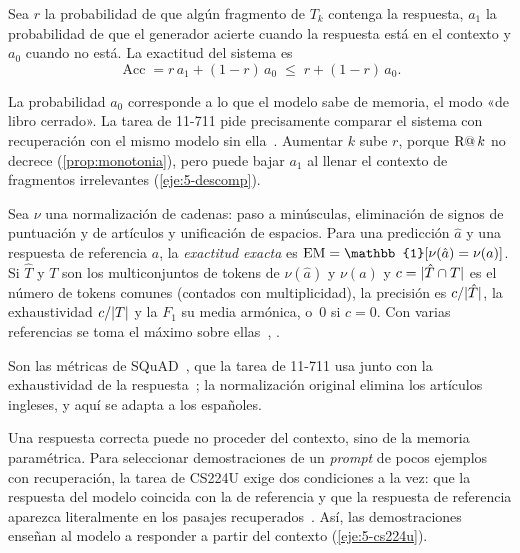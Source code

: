 \begin{proposicion}\label{prop:descomp}
Sea $r$ la probabilidad de que algún fragmento de $T_k$ contenga la respuesta, $a_1$ la probabilidad de que el generador acierte cuando la respuesta está en el contexto y $a_0$ cuando no está. La exactitud del sistema es
\[
\operatorname{Acc}=r\,a_1+(1-r)\,a_0\;\le\;r+(1-r)\,a_0 .
\]
\end{proposicion}

La probabilidad $a_0$ corresponde a lo que el modelo sabe de memoria, el modo «de libro cerrado». La tarea de 11-711 pide precisamente comparar el sistema con recuperación con el mismo modelo sin ella~\cite{cmu711}. Aumentar $k$ sube $r$, porque $\operatorname{R@}k$ no decrece (\cref{prop:monotonia}), pero puede bajar $a_1$ al llenar el contexto de fragmentos irrelevantes (\cref{eje:5-descomp}).

\begin{definicion}\label{def:em-f1}
Sea $\nu$ una normalización de cadenas: paso a minúsculas, eliminación de signos de puntuación y de artículos y unificación de espacios. Para una predicción $\hat a$ y una respuesta de referencia $a$, la \emph{exactitud exacta} es $\EM=\mathbb{1}[\nu(\hat a)=\nu(a)]$. Si $\hat T$ y $T$ son los multiconjuntos de tokens de $\nu(\hat a)$ y $\nu(a)$ y $c=\lvert\hat T\cap T\rvert$ es el número de tokens comunes (contados con multiplicidad), la precisión es $c/\lvert\hat T\rvert$, la exhaustividad $c/\lvert T\rvert$ y la $F_1$ su media armónica, o~0 si $c=0$. Con varias referencias se toma el máximo sobre ellas~\cite{squad}, \cite[§11.6]{jm3}.
\end{definicion}

Son las métricas de SQuAD~\cite{squad}, que la tarea de 11-711 usa junto con la exhaustividad de la respuesta~\cite{cmu711}; la normalización original elimina los artículos ingleses, y aquí se adapta a los españoles.

\addtocounter{definicion}{1}%

\begin{observacion}
Una respuesta correcta puede no proceder del contexto, sino de la memoria paramétrica. Para seleccionar demostraciones de un \emph{prompt} de pocos ejemplos con recuperación, la tarea de CS224U exige dos condiciones a la vez: que la respuesta del modelo coincida con la de referencia y que la respuesta de referencia aparezca literalmente en los pasajes recuperados~\cite{cs224u}. Así, las demostraciones enseñan al modelo a responder a partir del contexto (\cref{eje:5-cs224u}).
\end{observacion}

